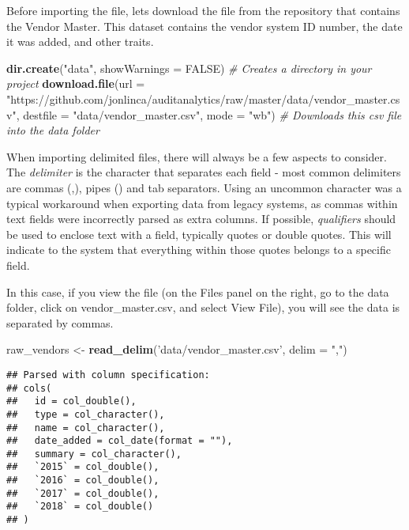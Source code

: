 \documentclass[
]{book}
\newenvironment{Shaded}{\begin{snugshade}}{\end{snugshade}}
\newcommand{\CommentTok}[1]{\textcolor[rgb]{0.56,0.35,0.01}{\textit{#1}}}
\newcommand{\DataTypeTok}[1]{\textcolor[rgb]{0.13,0.29,0.53}{#1}}
\newcommand{\KeywordTok}[1]{\textcolor[rgb]{0.13,0.29,0.53}{\textbf{#1}}}
\newcommand{\NormalTok}[1]{#1}
\newcommand{\OtherTok}[1]{\textcolor[rgb]{0.56,0.35,0.01}{#1}}
\newcommand{\StringTok}[1]{\textcolor[rgb]{0.31,0.60,0.02}{#1}}
\begin{document}
Before importing the file, lets download the file from the repository that contains the Vendor Master. This dataset contains the vendor system ID number, the date it was added, and other traits.

\begin{Shaded}
\begin{Highlighting}[]
\KeywordTok{dir.create}\NormalTok{(}\StringTok{"data"}\NormalTok{, }\DataTypeTok{showWarnings =} \OtherTok{FALSE}\NormalTok{) }\CommentTok{# Creates a directory in your project}
\KeywordTok{download.file}\NormalTok{(}\DataTypeTok{url =} \StringTok{"https://github.com/jonlinca/auditanalytics/raw/master/data/vendor_master.csv"}\NormalTok{,}
              \DataTypeTok{destfile =} \StringTok{"data/vendor_master.csv"}\NormalTok{, }\DataTypeTok{mode =} \StringTok{"wb"}\NormalTok{) }\CommentTok{# Downloads this csv file into the data folder}
\end{Highlighting}
\end{Shaded}

When importing delimited files, there will always be a few aspects to consider. The \emph{delimiter} is the character that separates each field - most common delimiters are commas (,), pipes (\textbar) and tab separators. Using an uncommon character was a typical workaround when exporting data from legacy systems, as commas within text fields were incorrectly parsed as extra columns. If possible, \emph{qualifiers} should be used to enclose text with a field, typically quotes or double quotes. This will indicate to the system that everything within those quotes belongs to a specific field.

In this case, if you view the file (on the Files panel on the right, go to the data folder, click on vendor\_master.csv, and select View File), you will see the data is separated by commas.

\begin{Shaded}
\begin{Highlighting}[]
\NormalTok{raw_vendors <-}\StringTok{ }\KeywordTok{read_delim}\NormalTok{(}\StringTok{'data/vendor_master.csv'}\NormalTok{, }\DataTypeTok{delim =} \StringTok{","}\NormalTok{)}
\end{Highlighting}
\end{Shaded}

\begin{verbatim}
## Parsed with column specification:
## cols(
##   id = col_double(),
##   type = col_character(),
##   name = col_character(),
##   date_added = col_date(format = ""),
##   summary = col_character(),
##   `2015` = col_double(),
##   `2016` = col_double(),
##   `2017` = col_double(),
##   `2018` = col_double()
## )
\end{verbatim}
\end{document}
